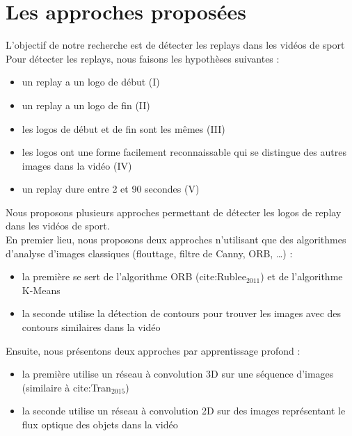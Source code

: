 \documentclass[11pt]{article}
\begin{document}
\newpage
\section{Les approches proposées}
\label{sec:orgbb25027}
L'objectif de notre recherche est de détecter les replays dans les vidéos de sport\\

Pour détecter les replays, nous faisons les hypothèses suivantes :\\
\begin{itemize}
\item un replay a un logo de début (I)\\
\item un replay a un logo de fin (II)\\
\item les logos de début et de fin sont les mêmes (III)\\
\item les logos ont une forme facilement reconnaissable qui se distingue des  autres images dans la vidéo (IV)\\
\item un replay dure entre 2 et 90 secondes (V)\\
\end{itemize}

Nous proposons plusieurs approches permettant de détecter les logos de replay dans les vidéos de sport.\\
En premier lieu, nous proposons deux approches n'utilisant que des algorithmes d'analyse d'images classiques (flouttage, filtre de Canny, ORB, \ldots{}) :\\
\begin{itemize}
\item la première se sert de l'algorithme ORB (cite:Rublee\(_{\text{2011}}\)) et de l'algorithme K-Means\\
\item la seconde utilise la détection de contours pour trouver les images avec des contours similaires dans la vidéo\\
\end{itemize}
Ensuite, nous présentons deux approches par apprentissage profond :\\
\begin{itemize}
\item la première utilise un réseau à convolution 3D sur une séquence d'images (similaire à cite:Tran\(_{\text{2015}}\))\\
\item la seconde utilise un réseau à convolution 2D sur des images représentant le flux optique des objets dans la vidéo\\
\end{itemize}
\end{document}
